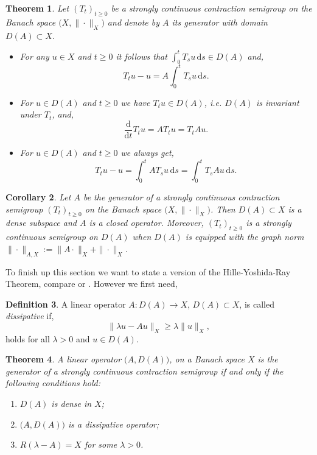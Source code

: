 \documentclass[a4paper, 12pt]{report}
\newtheorem{theorem}{Theorem}[section]
\newtheorem{corollary}[theorem]{Corollary}
\theoremstyle{remark}
\theoremstyle{definition}
\newtheorem{definition}[theorem]{Definition}
\begin{document}
\begin{theorem}
Let $(T_t)_{t \ge 0}$ be a strongly continuous contraction semigroup on the Banach space $\big(X, \|\cdot\|_X\big)$ and denote by $A$ its generator with domain $D(A) \subset X$.
\begin{itemize}
\item[A.] For any $u \in X$ and $t \ge 0$ it follows that $\int_0^tT_su\,\mathrm{d}s \in D(A)$ and,
\begin{equation}
T_tu - u = A\int_0^tT_su\,\mathrm{d}s.
\end{equation}

\item[B.] For $u \in D(A)$ and $t \ge 0$ we have $T_tu \in D(A)$, i.e. $D(A)$ is invariant under $T_t$, and,
\begin{equation}
\frac{\mathrm{d}}{\mathrm{d}t}T_tu = AT_tu = T_tAu.
\end{equation}

\item[C.] For $u \in D(A)$ and $t \ge 0$ we always get,
\begin{equation}
T_tu - u = \int_0^tAT_su\,\mathrm{d}s = \int_0^tT_sAu\,\mathrm{d}s.
\end{equation}
\end{itemize}
\end{theorem}
\begin{corollary}
Let $A$ be the generator of a strongly continuous contraction semigroup $(T_t)_{t \ge 0}$ on the Banach space $\big(X, \|\cdot\|_X\big)$.  Then $D(A) \subset X$ is a dense subspace and $A$ is a closed operator.  Moreover, $(T_t)_{t \ge 0}$ is a strongly continuous semigroup on $D(A)$ when $D(A)$ is equipped with the graph norm $\|\cdot\|_{A, X} := \|A\cdot\|_X + \|\cdot\|_X$.
\end{corollary}

To finish up this section we want to state a version of the Hille-Yoshida-Ray Theorem, compare \cite{I.88} or \cite{Vol1}.  However we first need,
\begin{definition}
A linear operator $A : D(A) \to X$, $D(A) \subset X$, is called \emph{dissipative} if,
$$
\|\lambda u - Au\|_X \ge \lambda\|u\|_X,
$$
holds for all $\lambda > 0$ and $u \in D(A)$.
\end{definition}

\begin{theorem}
A linear operator $\big(A, D(A)\big)$, on a Banach space $X$ is the generator of a strongly continuous contraction semigroup if and only if the following conditions hold:
\begin{enumerate}
\item $D(A)$ is dense in $X$;

\item $\big(A, D(A)\big)$ is a dissipative operator;

\item $R(\lambda - A) = X$ for some $\lambda > 0$.
\end{enumerate}
\end{theorem}
\end{document}
